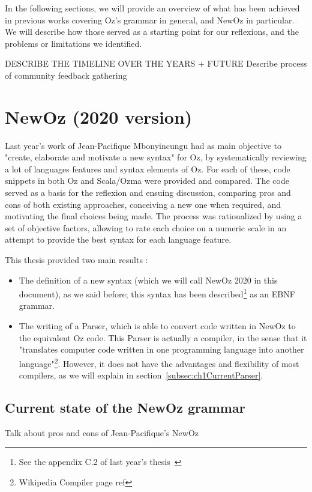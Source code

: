 In the following sections, we will provide an overview of what has been achieved in previous works covering Oz's grammar in general, and NewOz in particular.
We will describe how those served as a starting point for our reflexions, and the problems or limitations we identified.\newline

DESCRIBE THE TIMELINE OVER THE YEARS + FUTURE
Describe process of community feedback gathering


\section{NewOz (2020 version)}\label{sec:ch1JPNewOz}
Last year's work of Jean-Pacifique Mbonyincungu had as main objective to "create, elaborate and motivate a new syntax"\cite{jpthesis} for Oz, by systematically reviewing a lot of languages features and syntax elements of Oz.
For each of these, code snippets in both Oz and Scala/Ozma were provided and compared.
The code served as a basis for the reflexion and ensuing discussion, comparing pros and cons of both existing approaches, conceiving a new one when required, and motivating the final choices being made.
The process was rationalized by using a set of objective factors, allowing to rate each choice on a numeric scale in an attempt to provide the best syntax for each language feature.\newline

This thesis provided two main results :
\begin{itemize}
    \item The definition of a new syntax (which we will call NewOz 2020 in this document), as we said before;
    this syntax has been described\footnote{See the appendix C.2 of last year's thesis~\cite{jpthesis}} as an EBNF grammar.
    \item The writing of a Parser, which is able to convert code written in NewOz to the equivalent Oz code.
    This Parser is actually a compiler, in the sense that it "translates computer code written in one programming language into another language"\footnote{Wikipedia Compiler page ref}.
    However, it does not have the advantages and flexibility of most compilers, as we will explain in section~\ref{subsec:ch1CurrentParser}.
\end{itemize}

\subsection{Current state of the NewOz grammar}\label{subsec:ch1CurrentGrammar}
Talk about pros and cons of Jean-Pacifique's NewOz

